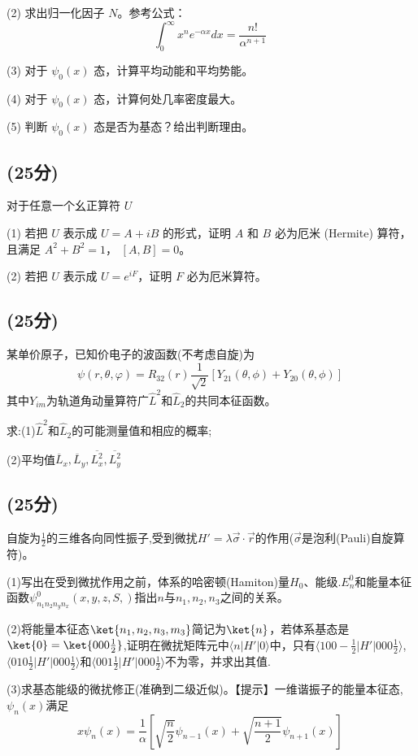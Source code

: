 (2) 求出归一化因子 $N$。参考公式：
\[\int_0^\infty x^n e^{- \alpha x} dx = \frac{n!}{\alpha^{n+1}}~\]

(3) 对于 $\psi_0(x)$ 态，计算平均动能和平均势能。

(4) 对于 $\psi_0(x)$ 态，计算何处几率密度最大。

(5) 判断 $\psi_0(x)$ 态是否为基态？给出判断理由。
\subsection{(25分)}
对于任意一个幺正算符 \( U \)

(1) 若把 \( U \) 表示成 \( U = A + iB \) 的形式，证明 \( A \) 和 \( B \) 必为厄米 (Hermite) 算符，且满足 \( A^2 + B^2 = 1 \)， \([A, B] = 0 \)。

(2) 若把 \( U \) 表示成 \( U = e^{iF} \)，证明 \( F \) 必为厄米算符。
\subsection{(25分)}
某单价原子，已知价电子的波函数(不考虑自旋)为
$$\psi(r,\theta,\varphi)=R_{32}(r)\frac{1}{\sqrt{2}}[Y_{21}(\theta,\phi)+Y_{20}(\theta,\phi)]~$$
其中$Y_{im}$为轨道角动量算符广$\hat{L}^2$和$\hat{L}_2$的共同本征函数。

求:(1)$\hat{L}^2$和$\hat{L}_2$的可能测量值和相应的概率;

(2)平均值$\overline{L}_x,\overline{L}_y,\overline{L^2_x},\overline{L^2_y}$
\subsection{(25分)}
自旋为$\frac{1}{2}$的三维各向同性振子,受到微扰$H'=\lambda \vec{\sigma}\cdot \vec{r}$的作用($\vec{\sigma}$是泡利(Pauli)自旋算符)。

(1)写出在受到微扰作用之前，体系的哈密顿(Hamiton)量$H_0$、能级.$E^0_n$和能量本征函数$\psi^0_{n_1n_2n_yn_x}(x,y,z,S,)$指出$n$与$n_1,n_2,n_3$之间的关系。

(2)将能量本征态$\ket{n_1,n_2,n_3,m_3}$简记为$\ket{n}$，若体系基态是$\ket{0}=\ket{000\frac{1}{2}}$,证明在微扰矩阵元中$\langle n | H' | 0 \rangle$中，只有$\langle 100-\frac{1}{2} | H' | 000\frac{1}{2} \rangle$,$\langle 010\frac{1}{2} | H' | 000\frac{1}{2} \rangle$和$\langle 001\frac{1}{2} | H' | 000\frac{1}{2} \rangle$不为零，并求出其值.

(3)求基态能级的微扰修正(准确到二级近似)。【提示】一维谐振子的能量本征态,$\psi_n(x)$满足
$$x\psi_n(x)=\frac{1}{\alpha}\left[\sqrt{\frac{n}{2}}\psi_{n-1}(x)+\sqrt{\frac{n+1}{2}}\psi_{n+1}(x)\right]~$$